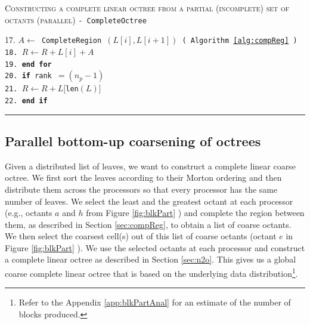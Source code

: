 \begin{table}
\begin{algorithm}{ \textsc{Constructing a complete linear octree from a partial (incomplete) set of octants (parallel)} \tt{- CompleteOctree}}
\begin{tabbing}
17.     \> \tt{$A \leftarrow $ CompleteRegion $\left(L[i], L[i+1]\right)$ ( Algorithm \ref{alg:compReg} )}\\
18.     \> \tt {$R \leftarrow R + L[i] + A$}\\
19. \tt{\bf{end for}}\\
20. {\tt \bf if} \= \tt{rank} $= (n_p - 1)$\\
21. \> \tt{$R \leftarrow R + L[$len$(L)]$ }\\
22. \tt{\bf{end if}}
\end{tabbing}
\label{alg:n2o}
\end{algorithm}
\rule{\textwidth}{0.01mm}
\end{table}

\subsection{Parallel bottom-up coarsening of octrees}
\label{sec:parCoarse}
Given a distributed list of leaves, we want to construct a complete
linear coarse octree. We first sort the leaves according to their
Morton ordering and then distribute them across the processors so that
every processor has the same number of leaves. We select the least and
the greatest octant at each processor (e.g., octants $a$ and $h$ from
Figure \ref{fig:blkPart} ) and complete the region between them, as
described in Section \ref{sec:compReg}, to obtain a list of coarse
octants. We then select the coarsest cell(s) out of this list of
coarse octants (octant $e$ in Figure \ref{fig:blkPart} ). We use the
selected octants at each processor and construct a complete linear
octree as described in Section \ref{sec:n2o}. This gives us a global
coarse complete linear octree that is based on the underlying data
distribution\footnote{Refer to the Appendix \ref{app:blkPartAnal} for
an estimate of the number of blocks produced.}.

